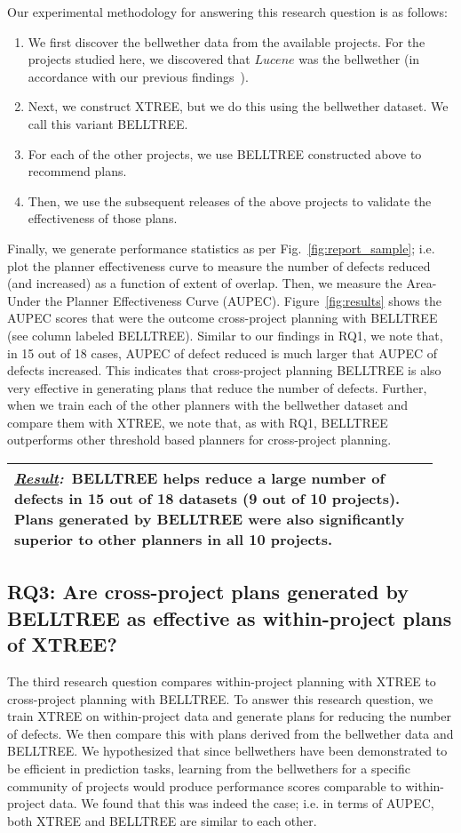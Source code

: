 \documentclass[smallextended]{svjour3}       %
\newcommand{\result}[1]{
\vspace{0.2cm}
\noindent\begin{minipage}{\linewidth}
\begin{tabular}{|p{0.95\linewidth}|}
\hline\vspace{-0.2cm}
\textbf{\textit{\underline{Result}:}}~#1\\\hline
\end{tabular}
\end{minipage}\bigstrut
}
\newcommand{\be}{\begin{enumerate}}
\newcommand{\ee}{\end{enumerate}}
\newcommand{\fig}[1]{Fig.~\ref{fig:#1}}
\begin{document}
Our experimental methodology for answering this research question is as follows:
\be
  \item We first discover the bellwether data from the available projects. For the projects studied here, we discovered that $Lucene$ was the bellwether (in accordance with our previous findings~\cite{krishna16, krishna17b}).
  \item Next, we construct XTREE, but we do this using the bellwether dataset. We call this variant BELLTREE.
  \item For each of the other projects, we use BELLTREE constructed above to recommend plans.
  \item Then, we use the subsequent releases of the above projects to validate the effectiveness of those plans.
\ee

Finally, we generate performance statistics as per \fig{report_sample}; i.e. plot the planner effectiveness curve to measure the number of defects reduced (and increased) as a function of extent of overlap. Then, we measure the Area-Under the Planner Effectiveness Curve (AUPEC). Figure~\ref{fig:results}\protect{} shows the AUPEC scores that were the outcome cross-project planning with BELLTREE (see column labeled BELLTREE). Similar to our findings in RQ1, we note that, in 15 out of 18 cases, AUPEC of defect reduced is much larger that AUPEC of defects increased. This indicates that cross-project planning BELLTREE is also very effective in generating plans that reduce the number of defects. Further, when we train each of the other planners with the bellwether dataset and compare them with XTREE, we note that, as with RQ1, BELLTREE outperforms other threshold based planners for cross-project planning. 

\result{BELLTREE helps reduce a large number of defects in 15 out of 18 datasets (9 out of 10 projects). Plans generated by BELLTREE were also significantly superior to other planners in all 10 projects.}
\vspace{-0.4cm}
\subsection*{{\bf RQ3: Are cross-project plans generated by BELLTREE as effective as within-project plans of XTREE?}}

The third research question compares within-project planning with XTREE to cross-project planning with BELLTREE. To answer this research question, we train XTREE on within-project data and generate plans for reducing the number of defects. We then compare this with plans derived from the bellwether data and BELLTREE. We hypothesized that since bellwethers have been demonstrated to be efficient in prediction tasks, learning from the bellwethers for a specific community of projects would produce performance scores comparable to within-project data. We found that this was indeed the case; i.e. in terms of AUPEC, both XTREE and BELLTREE are similar to each other.
\end{document}
